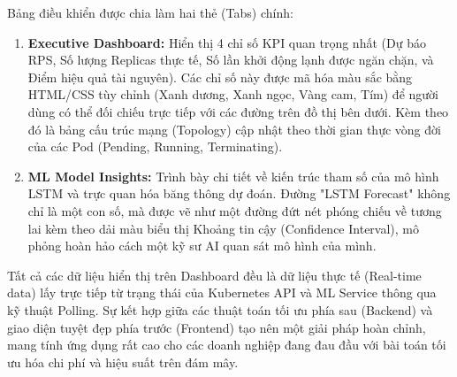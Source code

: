 Bảng điều khiển được chia làm hai thẻ (Tabs) chính:
\begin{enumerate}
    \item \textbf{Executive Dashboard:} Hiển thị 4 chỉ số KPI quan trọng nhất (Dự báo RPS, Số lượng Replicas thực tế, Số lần khởi động lạnh được ngăn chặn, và Điểm hiệu quả tài nguyên). Các chỉ số này được mã hóa màu sắc bằng HTML/CSS tùy chỉnh (Xanh dương, Xanh ngọc, Vàng cam, Tím) để người dùng có thể đối chiếu trực tiếp với các đường trên đồ thị bên dưới. Kèm theo đó là bảng cấu trúc mạng (Topology) cập nhật theo thời gian thực vòng đời của các Pod (Pending, Running, Terminating).
    \item \textbf{ML Model Insights:} Trình bày chi tiết về kiến trúc tham số của mô hình LSTM và trực quan hóa băng thông dự đoán. Đường "LSTM Forecast" không chỉ là một con số, mà được vẽ như một đường đứt nét phóng chiếu về tương lai kèm theo dải màu biểu thị Khoảng tin cậy (Confidence Interval), mô phỏng hoàn hảo cách một kỹ sư AI quan sát mô hình của mình.
\end{enumerate}

Tất cả các dữ liệu hiển thị trên Dashboard đều là dữ liệu thực tế (Real-time data) lấy trực tiếp từ trạng thái của Kubernetes API và ML Service thông qua kỹ thuật Polling. Sự kết hợp giữa các thuật toán tối ưu phía sau (Backend) và giao diện tuyệt đẹp phía trước (Frontend) tạo nên một giải pháp hoàn chỉnh, mang tính ứng dụng rất cao cho các doanh nghiệp đang đau đầu với bài toán tối ưu hóa chi phí và hiệu suất trên đám mây.